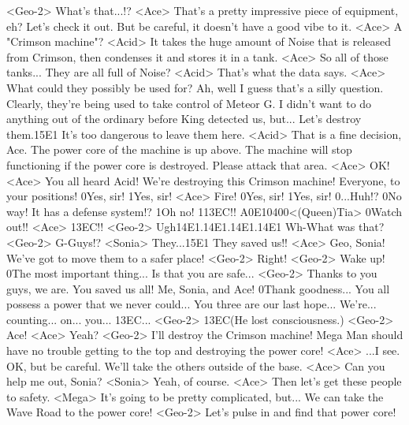 <Geo-2> What's that...!? 
<Ace> That's a pretty impressive piece of equipment, eh? 
Let's check it out. 
But be careful, it doesn't have a good vibe to it. 
<Ace> A "Crimson machine"? 
<Acid> It takes the huge amount of Noise that is released from 
Crimson, then condenses it and stores it in a tank. 
<Ace> So all of those tanks... They are all full of Noise? 
<Acid> That's what the data says. 
<Ace> What could they possibly be used for? 
Ah, well I guess that's a silly question. 
Clearly, they're being used to take control of Meteor G. 
I didn't want to do anything out of the ordinary before King detected us, but... 
Let's destroy them.{15}{E1} It's too dangerous to leave them here. 
<Acid> That is a fine decision, Ace. 
The power core of the machine is up above. 
The machine will stop functioning if the power core is destroyed. 
Please attack that area. 
<Ace> OK! 
<Ace> You all heard Acid! 
We're destroying this Crimson machine! 
Everyone, to your positions! 
0Yes, sir! 
1Yes, sir! 
<Ace> Fire! 
0Yes, sir! 
1Yes, sir! 
0...Huh!? 
0No way! It has a defense system!? 
1Oh no! 
1{13}{EC}!! 
{A0}{E1}{04}{00}<(Queen)Tia> 
0Watch out!! 
<Ace> {13}{EC}!! 
<Geo-2> Ugh{14}{E1}.{14}{E1}.{14}{E1}.{14}{E1} 
Wh-What was that? 
<Geo-2> G-Guys!? 
<Sonia> They...{15}{E1} They saved us!! 
<Ace> Geo, Sonia! 
We've got to move them to a safer place! 
<Geo-2> Right! 
<Geo-2> Wake up! 
0The most important thing... Is that you are safe... 
<Geo-2> Thanks to you guys, we are. 
You saved us all! 
Me, Sonia, and Ace! 
0Thank goodness... 
You all possess a power that we never could... 
You three are our last hope... 
We're... counting... on... you... 
{13}{EC}... 
<Geo-2> {13}{EC}(He lost consciousness.) 
<Geo-2> Ace! 
<Ace> Yeah? 
<Geo-2> I'll destroy the Crimson machine! 
Mega Man should have no trouble getting to the top 
and destroying the power core! 
<Ace> ...I see. 
OK, but be careful. 
We'll take the others outside of the base. 
<Ace> Can you help me out, Sonia? 
<Sonia> Yeah, of course. 
<Ace> Then let's get these people to safety. 
<Mega> It's going to be pretty complicated, but... 
We can take the Wave Road to the power core! 
<Geo-2> Let's pulse in and find that power core! 
